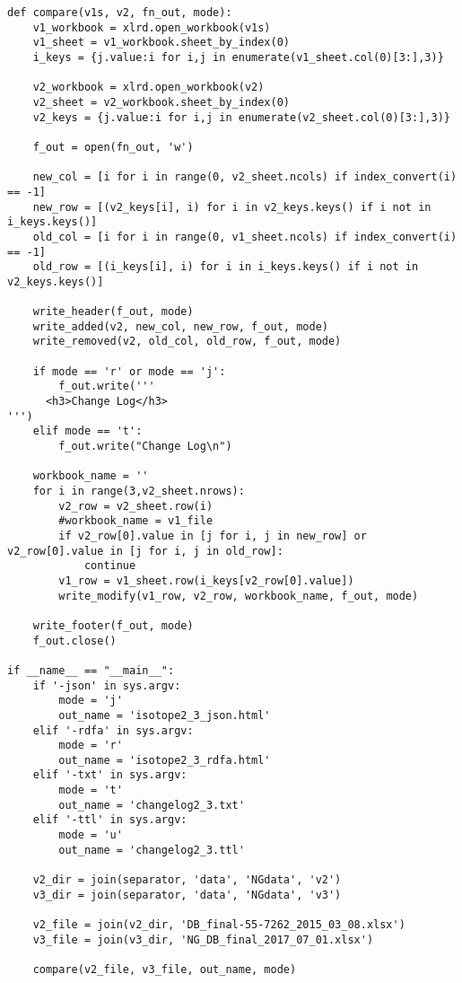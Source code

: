 \begin{verbatim}
def compare(v1s, v2, fn_out, mode):
	v1_workbook = xlrd.open_workbook(v1s)
	v1_sheet = v1_workbook.sheet_by_index(0)
	i_keys = {j.value:i for i,j in enumerate(v1_sheet.col(0)[3:],3)}

	v2_workbook = xlrd.open_workbook(v2)
	v2_sheet = v2_workbook.sheet_by_index(0)
	v2_keys = {j.value:i for i,j in enumerate(v2_sheet.col(0)[3:],3)}

	f_out = open(fn_out, 'w')

	new_col = [i for i in range(0, v2_sheet.ncols) if index_convert(i) == -1]
	new_row = [(v2_keys[i], i) for i in v2_keys.keys() if i not in i_keys.keys()]
	old_col = [i for i in range(0, v1_sheet.ncols) if index_convert(i) == -1]
	old_row = [(i_keys[i], i) for i in i_keys.keys() if i not in v2_keys.keys()]

	write_header(f_out, mode)
	write_added(v2, new_col, new_row, f_out, mode)
	write_removed(v2, old_col, old_row, f_out, mode)

	if mode == 'r' or mode == 'j':
		f_out.write('''
      <h3>Change Log</h3>
''')
	elif mode == 't':
		f_out.write("Change Log\n")

	workbook_name = ''
	for i in range(3,v2_sheet.nrows):
		v2_row = v2_sheet.row(i)
		#workbook_name = v1_file
		if v2_row[0].value in [j for i, j in new_row] or v2_row[0].value in [j for i, j in old_row]:
			continue
		v1_row = v1_sheet.row(i_keys[v2_row[0].value])
		write_modify(v1_row, v2_row, workbook_name, f_out, mode)
	
	write_footer(f_out, mode)
	f_out.close()

if __name__ == "__main__":
	if '-json' in sys.argv:
		mode = 'j'
		out_name = 'isotope2_3_json.html'
	elif '-rdfa' in sys.argv:
		mode = 'r'
		out_name = 'isotope2_3_rdfa.html'
	elif '-txt' in sys.argv:
		mode = 't'
		out_name = 'changelog2_3.txt'
	elif '-ttl' in sys.argv:
		mode = 'u'
		out_name = 'changelog2_3.ttl'

	v2_dir = join(separator, 'data', 'NGdata', 'v2')
	v3_dir = join(separator, 'data', 'NGdata', 'v3')
	
	v2_file = join(v2_dir, 'DB_final-55-7262_2015_03_08.xlsx')
	v3_file = join(v3_dir, 'NG_DB_final_2017_07_01.xlsx')

	compare(v2_file, v3_file, out_name, mode)
\end{verbatim}

